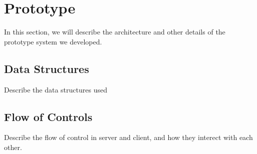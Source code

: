 \section{Prototype}
\label{sec:prototype}

	In this section, we will describe the architecture and other details of the prototype system we developed.
\subsection{Data Structures}
	 Describe the data structures used
\subsection{Flow of Controls}
	Describe the flow of control in server and client, and how they interect with each other.